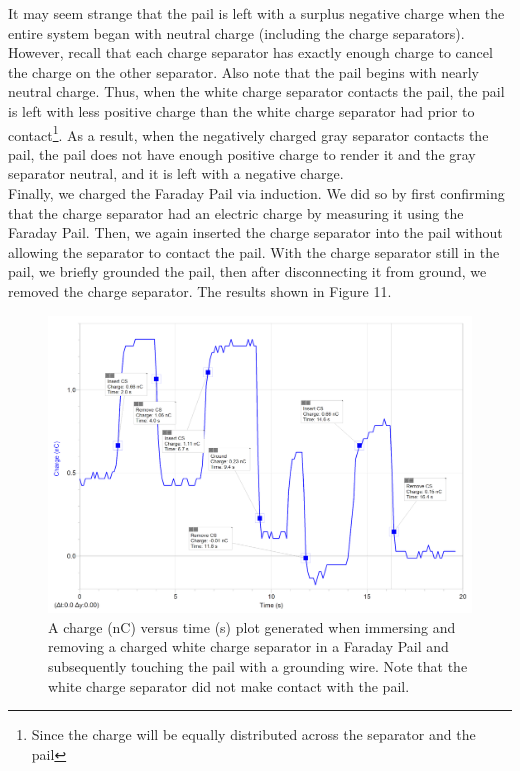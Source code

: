 \documentclass[12pt]{amsart}
\begin{document}
\indent It may seem strange that the pail is left with a surplus negative charge when the entire system began with neutral charge (including the charge separators). However, recall that each charge separator has exactly enough charge to cancel the charge on the other separator. Also note that the pail begins with nearly neutral charge. Thus, when the white charge separator contacts the pail, the pail is left with less positive charge than the white charge separator had prior to contact\footnote{Since the charge will be equally distributed across the separator and the pail}. As a result, when the negatively charged gray separator contacts the pail, the pail does not have enough positive charge to render it and the gray separator neutral, and it is left with a negative charge.\\

\indent Finally, we charged the Faraday Pail via induction. We did so by first confirming that the charge separator had an electric charge by measuring it using the Faraday Pail. Then, we again inserted the charge separator into the pail without allowing the separator to contact the pail. With the charge separator still in the pail, we briefly grounded the pail, then after disconnecting it from ground, we removed the charge separator. The results shown in Figure 11.
\begin{figure}[h]
	\includegraphics[width=\medgraph,scale=0.01]{SeparatorInduction.png}
	\caption{A charge (nC) versus time (s) plot generated when immersing and removing a charged white charge separator in a Faraday Pail and subsequently touching the pail with a grounding wire. Note that the white charge separator did not make contact with the pail.}
	\label{Induction}
\end{figure} 
\end{document}
